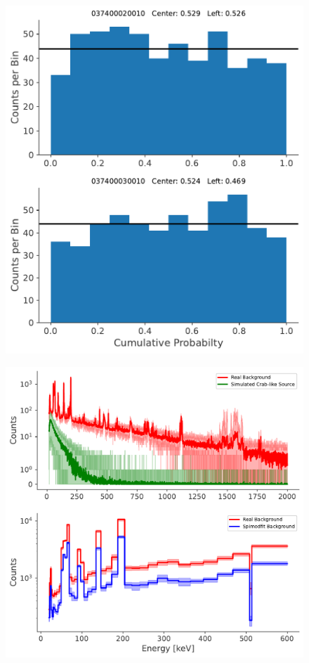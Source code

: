 \documentclass{report}
\begin{document}
\begin{figure}
  \includegraphics[width=\linewidth]{Images/PPC_and_Background_Analysis/037400020010_037400030010_cdf_smf_bkg.pdf}
  \vspace{-00pt}
  \caption{}
  \vspace{-00pt}
  \label{}
\end{figure}

\begin{figure}[h]
  \centering
  \includegraphics[width=\textwidth]{Images/PPC_and_Background_Analysis/background_spectrum.pdf}
  \caption{}
  \label{fig back spec}
\end{figure}
\end{document}
